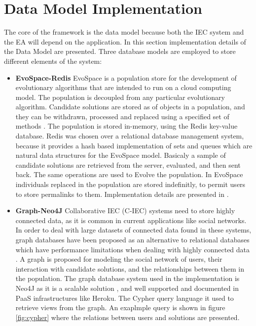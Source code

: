 \section{Data Model Implementation}
\label{sec:implementation}

The core of the framework is the data model because both the IEC system and the EA will 
depend on the application. In this section implementation details of the Data Model are presented.
Three database models are employed to store different elements of the system: 

\begin{itemize}
\item {\bf EvoSpace-Redis} 
EvoSpace is a population store \cite{Evospace}  for the development of 
evolutionary algorithms that are intended to run on a cloud computing model. 
The population is decoupled from any particular evolutionary algorithm. 
Candidate solutions are stored as of objects in a population, and they can be withdrawn, 
processed and replaced using a specified set of methods \cite{GValdez2015}. The population
is stored in-memory, using the Redis key-value database. Redis was chosen over a relational 
database management system, because it provides a hash based implementation of sets and 
queues which are natural data structures for the EvoSpace model. Basicaly a sample of 
candidate solutions are retrieved from the server, evaluated, and then sent back. 
The same operations are used to Evolve the population. In EvoSpace individuals replaced 
in the population are stored indefinitly, to permit users to store permalinks to them.
Implementation details are presented in \cite{garcia2013evospace}.

\item {\bf Graph-Neo4J} 
 Collaborative IEC (C-IEC) systems need to store highly connected data, as it is common 
 in current applications like social networks. In order to deal with large datasets of connected 
 data found in these systems, graph databases \cite{angles2012comparison} have been proposed 
 as an alternative to relational databases which have performance limitations when dealing with 
 highly connected data \cite{holzschuher2013performance}.
 A graph is proposed for modeling the social network of users, their interaction with 
 candidate solutions, and the relationships between them in the population.
 The graph database system used in the implementation is Neo4J as it is
 a scalable solution \cite{miller2013graph,holzschuher2013performance}, and well 
 supported and documented in PaaS infrastructures like Heroku. The Cypher query 
 language it used to retrieve views from the graph.
 An exaplmple query is shown in figure \ref{fig:cypher} where the relations 
 between users and solutions are presented.
  

\end{itemize}
